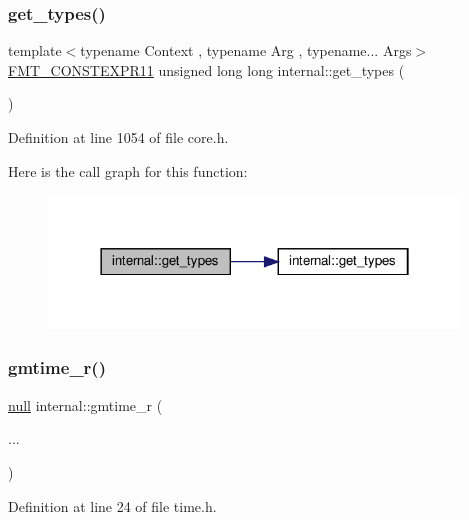 \subsubsection{\texorpdfstring{get\+\_\+types()}{get\_types()}\hspace{0.1cm}{\footnotesize\ttfamily [2/2]}}
{\footnotesize\ttfamily template$<$typename Context , typename Arg , typename... Args$>$ \\
\hyperlink{core_8h_a056f29fbe3ea234ac0cc417fb866a189}{F\+M\+T\+\_\+\+C\+O\+N\+S\+T\+E\+X\+P\+R11} unsigned long long internal\+::get\+\_\+types (\begin{DoxyParamCaption}{ }\end{DoxyParamCaption})}



Definition at line 1054 of file core.\+h.

Here is the call graph for this function\+:
\nopagebreak
\begin{figure}[H]
\begin{center}
\leavevmode
\includegraphics[width=310pt]{namespaceinternal_ac95af6018795359d47a7063b508fbd7b_cgraph}
\end{center}
\end{figure}
\mbox{\label{namespaceinternal_a6a29b192fce543ff8c18fe7bedf3e321}} 
\subsubsection{\texorpdfstring{gmtime\+\_\+r()}{gmtime\_r()}}
{\footnotesize\ttfamily \hyperlink{structinternal_1_1null}{null} internal\+::gmtime\+\_\+r (\begin{DoxyParamCaption}\item[{}]{... }\end{DoxyParamCaption})\hspace{0.3cm}{\ttfamily [inline]}}



Definition at line 24 of file time.\+h.


